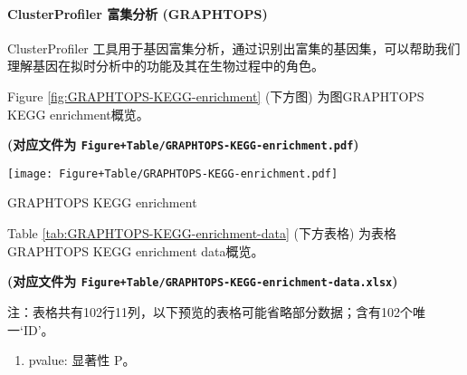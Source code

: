\documentclass[
]{article}
\providecommand{\tightlist}{%
  \setlength{\itemsep}{0pt}\setlength{\parskip}{0pt}}
\begin{document}
\begin{center}\vspace{1.5cm}\end{center}

\hypertarget{clusterprofiler-ux5bccux96c6ux5206ux6790-graphtops}{%
\paragraph{ClusterProfiler 富集分析 (GRAPHTOPS)}\label{clusterprofiler-ux5bccux96c6ux5206ux6790-graphtops}}

ClusterProfiler 工具用于基因富集分析，通过识别出富集的基因集，可以帮助我们理解基因在拟时分析中的功能及其在生物过程中的角色。

\begin{center}\vspace{1.5cm}\end{center}

Figure \ref{fig:GRAPHTOPS-KEGG-enrichment} (下方图) 为图GRAPHTOPS KEGG enrichment概览。

\textbf{(对应文件为 \texttt{Figure+Table/GRAPHTOPS-KEGG-enrichment.pdf})}

\def\@captype{figure}
\begin{center}
\texttt{[image: Figure+Table/GRAPHTOPS-KEGG-enrichment.pdf]}
\caption{GRAPHTOPS KEGG enrichment}\label{fig:GRAPHTOPS-KEGG-enrichment}
\end{center}

\begin{center}\vspace{1.5cm}\end{center}

\begin{center}\vspace{1.5cm}\end{center}

Table \ref{tab:GRAPHTOPS-KEGG-enrichment-data} (下方表格) 为表格GRAPHTOPS KEGG enrichment data概览。

\textbf{(对应文件为 \texttt{Figure+Table/GRAPHTOPS-KEGG-enrichment-data.xlsx})}

\begin{center}\begin{tcolorbox}[colback=gray!10, colframe=gray!50, width=0.9\linewidth, arc=1mm, boxrule=0.5pt]注：表格共有102行11列，以下预览的表格可能省略部分数据；含有102个唯一`ID'。
\end{tcolorbox}
\end{center}
\begin{center}\begin{tcolorbox}[colback=gray!10, colframe=gray!50, width=0.9\linewidth, arc=1mm, boxrule=0.5pt]\begin{enumerate}\tightlist
\item pvalue:  显著性 P。
\end{enumerate}\end{tcolorbox}
\end{center}
\end{document}
